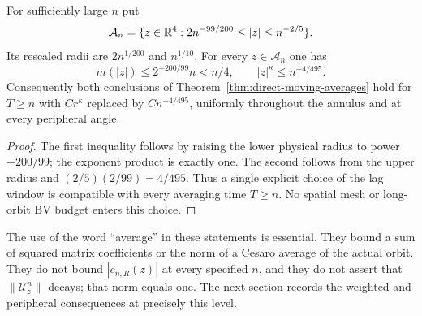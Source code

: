 \begin{corollary}
\label{cor:direct-annular-averages}
For sufficiently large $n$ put
\begin{equation}\label{eq:direct-annulus}
 \mathcal A_n=\{z\in\R^4:2n^{-99/200}\le|z|\le n^{-2/5}\}.
\end{equation}
Its rescaled radii are $2n^{1/200}$ and $n^{1/10}$.
For every $z\in\mathcal A_n$ one has
\begin{equation}\label{eq:direct-annular-scale}
 m(|z|)\le2^{-200/99}n<n/4,
 \qquad |z|^\kappa\le n^{-4/495}.
\end{equation}
Consequently both conclusions of
Theorem~\ref{thm:direct-moving-averages} hold for $T\ge n$ with
$Cr^\kappa$ replaced by $Cn^{-4/495}$, uniformly throughout the
annulus and at every peripheral angle.
\end{corollary}
\begin{proof}
The first inequality follows by raising the lower physical radius to
power $-200/99$; the exponent product is exactly one. The second follows
from the upper radius and $(2/5)(2/99)=4/495$. Thus a single explicit
choice of the lag window is compatible with every averaging time
$T\ge n$. No spatial mesh or long-orbit BV budget enters this choice.
\end{proof}

The use of the word ``average'' in these statements is essential.
They bound a sum of squared matrix coefficients or the norm of a
Cesaro average of the actual orbit. They do not bound
$|c_{n,R}(z)|$ at every specified $n$, and they do not assert that
$\|\mathcal U_z^n\|$ decays; that norm equals one. The next section
records the weighted and peripheral consequences at precisely this
level.
